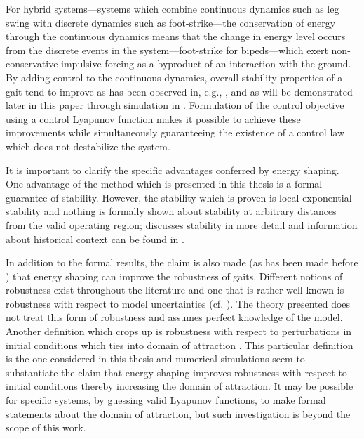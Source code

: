 For hybrid systems---systems which combine continuous dynamics such as leg
swing with discrete dynamics such as foot-strike---the conservation of energy
through the continuous dynamics means that the change in energy level occurs
from the discrete events in the system---foot-strike for bipeds---which exert
non-conservative impulsive forcing as a byproduct of an interaction with the
ground.
%
By adding control to the continuous dynamics, overall stability properties of a
gait tend to improve as has been observed in, e.g., \cite{Spong2003}, and as will
be demonstrated later in this paper through simulation in
.
%
Formulation of the control objective using a control Lyapunov function makes it
possible to achieve these improvements while simultaneously guaranteeing the
existence of a control law which does not destabilize the system.

It is important to clarify the specific advantages conferred by energy shaping.
%
One advantage of the method which is presented in this thesis is a formal
guarantee of stability.
%
However, the stability which is proven is local exponential stability and
nothing is formally shown about stability at arbitrary distances from the valid
operating region;  discusses stability in more detail
and information about historical context can be found in
.

In addition to the formal results, the claim is also made (as has been made
before \cite{Spong2003}) that energy shaping can improve the robustness of
gaits.
%
Different notions of robustness exist throughout the literature and one that is
rather well known is robustness with respect to model uncertainties
(cf. \cite{Freeman1996}).
%
The theory presented does not treat this form of robustness and assumes perfect
knowledge of the model.
%
Another definition which crops up is robustness with respect to perturbations in
initial conditions which ties into domain of attraction \cite{Chesi2011}.
%
This particular definition is the one considered in this thesis and numerical
simulations seem to substantiate the claim that energy shaping improves
robustness with respect to initial conditions thereby increasing the domain of
attraction.
%
It may be possible for specific systems, by guessing valid Lyapunov functions,
to make formal statements about the domain of attraction, but such investigation
is beyond the scope of this work.

